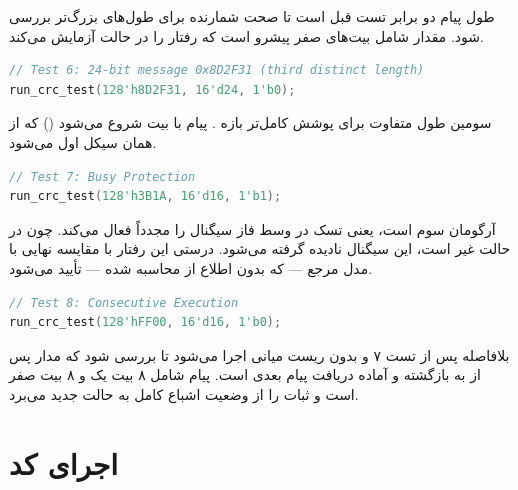 \vspace{-0.2cm}
طول پیام دو برابر تست قبل است تا صحت شمارنده  برای طول‌های
بزرگ‌تر بررسی شود. مقدار  شامل بیت‌های صفر پیشرو است که رفتار
 را در حالت  آزمایش می‌کند.

\vspace{0.8cm}
\begin{latin}
    \begin{lstlisting}[language=Verilog]
// Test 6: 24-bit message 0x8D2F31 (third distinct length)
run_crc_test(128'h8D2F31, 16'd24, 1'b0);
\end{lstlisting}
\end{latin}

\vspace{-0.2cm}
سومین طول متفاوت برای پوشش کامل‌تر بازه . پیام با بیت
 شروع می‌شود () که از همان سیکل اول
 می‌شود.

\vspace{0.8cm}
\begin{latin}
    \begin{lstlisting}[language=Verilog]
// Test 7: Busy Protection
run_crc_test(128'h3B1A, 16'd16, 1'b1);
\end{lstlisting}
\end{latin}

\vspace{-0.2cm}
آرگومان سوم  است، یعنی تسک در وسط فاز  سیگنال
 را مجدداً فعال می‌کند. چون  در حالت غیر 
است، این سیگنال نادیده گرفته می‌شود. درستی این رفتار با مقایسه 
نهایی با مدل مرجع — که بدون اطلاع از  محاسبه شده — تأیید می‌شود.

\vspace{0.8cm}
\begin{latin}
    \begin{lstlisting}[language=Verilog]
// Test 8: Consecutive Execution
run_crc_test(128'hFF00, 16'd16, 1'b0);
\end{lstlisting}
\end{latin}

\vspace{-0.2cm}
بلافاصله پس از تست ۷ و بدون ریست میانی اجرا می‌شود تا بررسی شود که مدار
پس از  به  بازگشته و آماده دریافت پیام بعدی است. پیام
 شامل ۸ بیت یک و ۸ بیت صفر است و ثبات را از وضعیت اشباع
کامل به حالت جدید می‌برد.

\section{اجرای کد}

